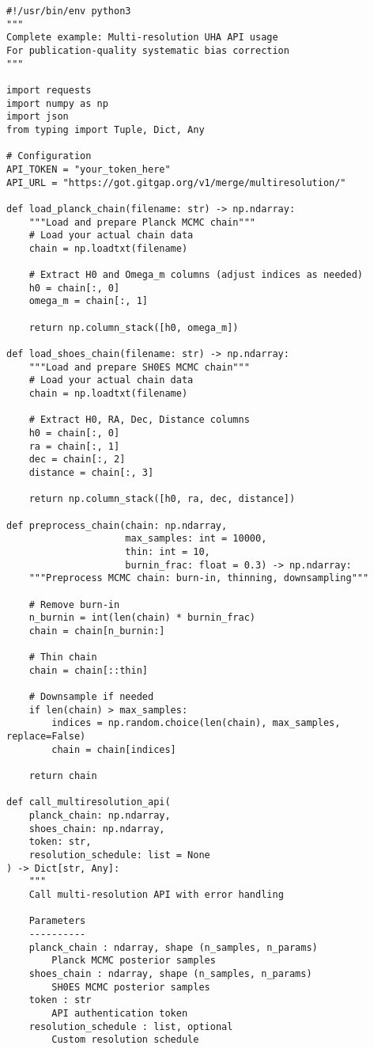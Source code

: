 \documentclass[11pt]{article}
\begin{document}
\begin{lstlisting}[style=python, caption={Production-ready implementation}]
#!/usr/bin/env python3
"""
Complete example: Multi-resolution UHA API usage
For publication-quality systematic bias correction
"""

import requests
import numpy as np
import json
from typing import Tuple, Dict, Any

# Configuration
API_TOKEN = "your_token_here"
API_URL = "https://got.gitgap.org/v1/merge/multiresolution/"

def load_planck_chain(filename: str) -> np.ndarray:
    """Load and prepare Planck MCMC chain"""
    # Load your actual chain data
    chain = np.loadtxt(filename)

    # Extract H0 and Omega_m columns (adjust indices as needed)
    h0 = chain[:, 0]
    omega_m = chain[:, 1]

    return np.column_stack([h0, omega_m])

def load_shoes_chain(filename: str) -> np.ndarray:
    """Load and prepare SH0ES MCMC chain"""
    # Load your actual chain data
    chain = np.loadtxt(filename)

    # Extract H0, RA, Dec, Distance columns
    h0 = chain[:, 0]
    ra = chain[:, 1]
    dec = chain[:, 2]
    distance = chain[:, 3]

    return np.column_stack([h0, ra, dec, distance])

def preprocess_chain(chain: np.ndarray,
                     max_samples: int = 10000,
                     thin: int = 10,
                     burnin_frac: float = 0.3) -> np.ndarray:
    """Preprocess MCMC chain: burn-in, thinning, downsampling"""

    # Remove burn-in
    n_burnin = int(len(chain) * burnin_frac)
    chain = chain[n_burnin:]

    # Thin chain
    chain = chain[::thin]

    # Downsample if needed
    if len(chain) > max_samples:
        indices = np.random.choice(len(chain), max_samples, replace=False)
        chain = chain[indices]

    return chain

def call_multiresolution_api(
    planck_chain: np.ndarray,
    shoes_chain: np.ndarray,
    token: str,
    resolution_schedule: list = None
) -> Dict[str, Any]:
    """
    Call multi-resolution API with error handling

    Parameters
    ----------
    planck_chain : ndarray, shape (n_samples, n_params)
        Planck MCMC posterior samples
    shoes_chain : ndarray, shape (n_samples, n_params)
        SH0ES MCMC posterior samples
    token : str
        API authentication token
    resolution_schedule : list, optional
        Custom resolution schedule


\end{lstlisting}
\end{document}
